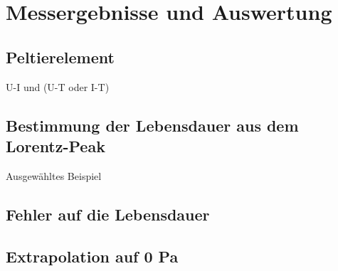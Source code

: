 \section{Messergebnisse und Auswertung}
\subsection{Peltierelement}
U-I und (U-T oder I-T)
\subsection{Bestimmung der Lebensdauer aus dem Lorentz-Peak}
Ausgewähltes Beispiel
\subsection{Fehler auf die Lebensdauer}
\subsection{Extrapolation auf 0 Pa}